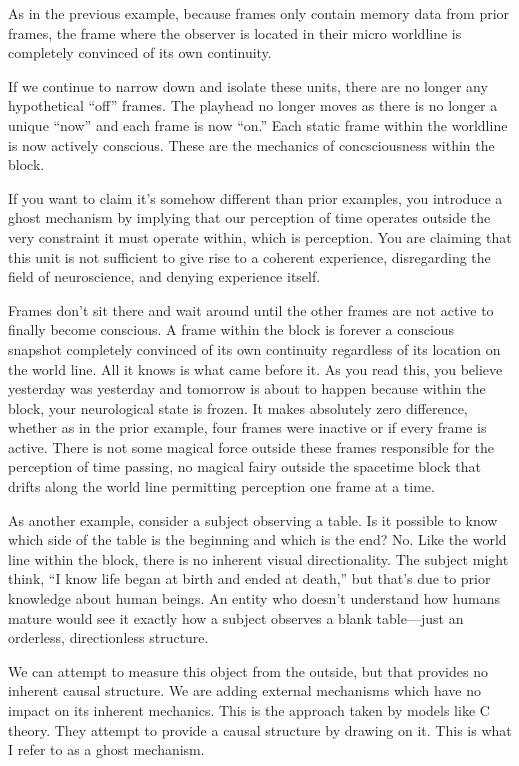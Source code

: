 \documentclass[11pt,a4paper]{article}
\begin{document}
As in the previous example, because frames only contain memory data from prior frames, the frame where the observer is located in their micro worldline is completely convinced of its own continuity.

If we continue to narrow down and isolate these units, there are no longer any hypothetical ``off'' frames. The playhead no longer moves as there is no longer a unique ``now'' and each frame is now ``on.'' Each static frame within the worldline is now actively conscious. These are the mechanics of concsciousness within the block. 

If you want to claim it's somehow different than prior examples, you introduce a ghost mechanism by implying that our perception of time operates outside the very constraint it must operate within, which is perception. You are claiming that this unit is not sufficient to give rise to a coherent experience, disregarding the field of neuroscience, and denying experience itself.

Frames don't sit there and wait around until the other frames are not active to finally become conscious. A frame within the block is forever a conscious snapshot completely convinced of its own continuity regardless of its location on the world line. All it knows is what came before it. As you read this, you believe yesterday was yesterday and tomorrow is about to happen because within the block, your neurological state is frozen. It makes absolutely zero difference, whether as in the prior example, four frames were inactive or if every frame is active. There is not some magical force outside these frames responsible for the perception of time passing, no magical fairy outside the spacetime block that drifts along the world line permitting perception one frame at a time.

As another example, consider a subject observing a table. Is it possible to know which side of the table is the beginning and which is the end? No. Like the world line within the block, there is no inherent visual directionality. The subject might think, “I know life began at birth and ended at death,” but that's due to prior knowledge about human beings. An entity who doesn't understand how humans mature would see it exactly how a subject observes a blank table—just an orderless, directionless structure.

We can attempt to measure this object from the outside, but that provides no inherent causal structure. We are adding external mechanisms which have no impact on its inherent mechanics. This is the approach taken by models like C theory. They attempt to provide a causal structure by drawing on it. This is what I refer to as a ghost mechanism.
\end{document}

